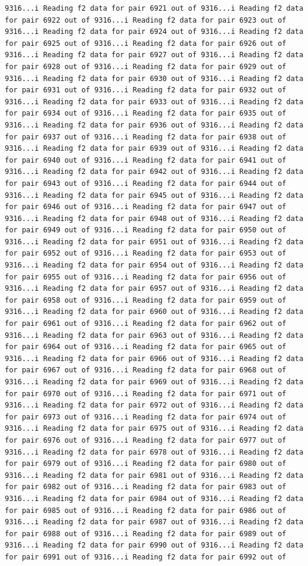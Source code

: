 \documentclass[
]{article}
\begin{document}
\begin{verbatim}
9316...i Reading f2 data for pair 6921 out of 9316...i Reading f2 data for pair 6922 out of 9316...i Reading f2 data for pair 6923 out of 9316...i Reading f2 data for pair 6924 out of 9316...i Reading f2 data for pair 6925 out of 9316...i Reading f2 data for pair 6926 out of 9316...i Reading f2 data for pair 6927 out of 9316...i Reading f2 data for pair 6928 out of 9316...i Reading f2 data for pair 6929 out of 9316...i Reading f2 data for pair 6930 out of 9316...i Reading f2 data for pair 6931 out of 9316...i Reading f2 data for pair 6932 out of 9316...i Reading f2 data for pair 6933 out of 9316...i Reading f2 data for pair 6934 out of 9316...i Reading f2 data for pair 6935 out of 9316...i Reading f2 data for pair 6936 out of 9316...i Reading f2 data for pair 6937 out of 9316...i Reading f2 data for pair 6938 out of 9316...i Reading f2 data for pair 6939 out of 9316...i Reading f2 data for pair 6940 out of 9316...i Reading f2 data for pair 6941 out of 9316...i Reading f2 data for pair 6942 out of 9316...i Reading f2 data for pair 6943 out of 9316...i Reading f2 data for pair 6944 out of 9316...i Reading f2 data for pair 6945 out of 9316...i Reading f2 data for pair 6946 out of 9316...i Reading f2 data for pair 6947 out of 9316...i Reading f2 data for pair 6948 out of 9316...i Reading f2 data for pair 6949 out of 9316...i Reading f2 data for pair 6950 out of 9316...i Reading f2 data for pair 6951 out of 9316...i Reading f2 data for pair 6952 out of 9316...i Reading f2 data for pair 6953 out of 9316...i Reading f2 data for pair 6954 out of 9316...i Reading f2 data for pair 6955 out of 9316...i Reading f2 data for pair 6956 out of 9316...i Reading f2 data for pair 6957 out of 9316...i Reading f2 data for pair 6958 out of 9316...i Reading f2 data for pair 6959 out of 9316...i Reading f2 data for pair 6960 out of 9316...i Reading f2 data for pair 6961 out of 9316...i Reading f2 data for pair 6962 out of 9316...i Reading f2 data for pair 6963 out of 9316...i Reading f2 data for pair 6964 out of 9316...i Reading f2 data for pair 6965 out of 9316...i Reading f2 data for pair 6966 out of 9316...i Reading f2 data for pair 6967 out of 9316...i Reading f2 data for pair 6968 out of 9316...i Reading f2 data for pair 6969 out of 9316...i Reading f2 data for pair 6970 out of 9316...i Reading f2 data for pair 6971 out of 9316...i Reading f2 data for pair 6972 out of 9316...i Reading f2 data for pair 6973 out of 9316...i Reading f2 data for pair 6974 out of 9316...i Reading f2 data for pair 6975 out of 9316...i Reading f2 data for pair 6976 out of 9316...i Reading f2 data for pair 6977 out of 9316...i Reading f2 data for pair 6978 out of 9316...i Reading f2 data for pair 6979 out of 9316...i Reading f2 data for pair 6980 out of 9316...i Reading f2 data for pair 6981 out of 9316...i Reading f2 data for pair 6982 out of 9316...i Reading f2 data for pair 6983 out of 9316...i Reading f2 data for pair 6984 out of 9316...i Reading f2 data for pair 6985 out of 9316...i Reading f2 data for pair 6986 out of 9316...i Reading f2 data for pair 6987 out of 9316...i Reading f2 data for pair 6988 out of 9316...i Reading f2 data for pair 6989 out of 9316...i Reading f2 data for pair 6990 out of 9316...i Reading f2 data for pair 6991 out of 9316...i Reading f2 data for pair 6992 out of 
\end{verbatim}
\end{document}
